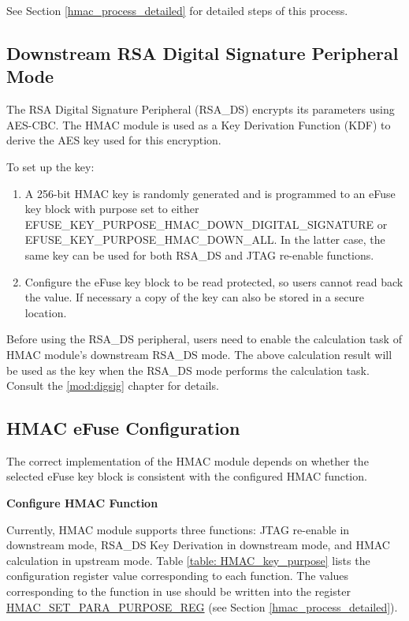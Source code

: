 \documentclass[main\_\_EN.tex]{subfiles}
\begin{document}
See Section \ref{hmac_process_detailed} for detailed steps of this process.

\subsection{Downstream RSA Digital Signature Peripheral Mode}

The RSA Digital Signature Peripheral (RSA\_DS) encrypts its parameters using AES-CBC. The HMAC module is used as a Key Derivation Function (KDF) to derive the AES key used for this encryption.

To set up the key:

\begin{enumerate}
\item A 256-bit HMAC key is randomly generated and is programmed to an eFuse key block with purpose set to either EFUSE\_KEY\_PURPOSE\_HMAC\_DOWN\_DIGITAL\_SIGNATURE or EFUSE\_KEY\_PURPOSE\_HMAC\_DOWN\_ALL.  In the latter case, the same key can be used for both RSA\_DS and JTAG re-enable functions.
\item Configure the eFuse key block to be read protected, so users cannot read back the value. If necessary a copy of the key can also be stored in a secure location.
\end{enumerate}

Before using the RSA\_DS peripheral, users need to enable the calculation task of HMAC module's downstream RSA\_DS mode. The above calculation result will be used as the key when the RSA\_DS mode performs the calculation task. Consult the \ref{mod:digsig} chapter for details.

\subsection{HMAC eFuse Configuration}

The correct implementation of the HMAC module depends on whether the selected eFuse key block is consistent with the configured HMAC function.

\textbf{Configure HMAC Function}
\label{hmac_config_function}

Currently, HMAC module supports three functions: JTAG re-enable in downstream mode, RSA\_DS Key Derivation in downstream mode, and HMAC calculation in upstream mode. Table \ref{table: HMAC_key_purpose} lists the configuration register value corresponding to each function. The values corresponding to the function in use should be written into the register \hyperref[regdesc:HMACSETPARAPURPOSEREG]{HMAC\_SET\_PARA\_PURPOSE\_REG} (see Section \ref{hmac_process_detailed}).
\end{document}
